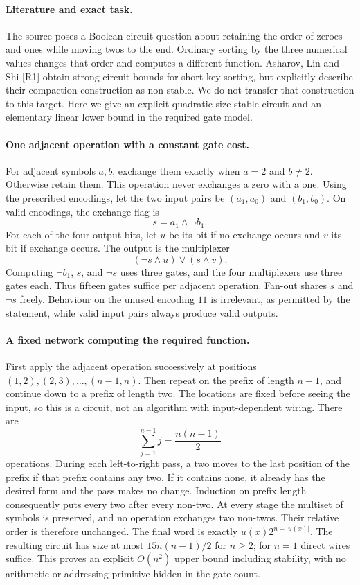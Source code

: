 \documentclass[11pt,a4paper]{article}
\begin{document}
\paragraph{Literature and exact task.}
The source poses a Boolean-circuit question about retaining the order
of zeroes and ones while moving twos to the end. Ordinary sorting
by the three numerical values changes that order and computes a
different function. Asharov, Lin and Shi [R1] obtain strong circuit
bounds for short-key sorting, but explicitly describe their compaction
construction as non-stable. We do not transfer that construction to
this target. Here we give an explicit quadratic-size stable circuit
and an elementary linear lower bound in the required gate model.

\paragraph{One adjacent operation with a constant gate cost.}
For adjacent symbols $a,b$, exchange them exactly when $a=2$ and
$b\ne2$. Otherwise retain them. This operation never exchanges a zero
with a one. Using the prescribed encodings, let the two input pairs be
$(a_1,a_0)$ and $(b_1,b_0)$. On valid encodings, the exchange flag is
\[
                         s=a_1\wedge\neg b_1.
\]
For each of the four output bits, let $u$ be its bit if no exchange
occurs and $v$ its bit if exchange occurs. The output is the multiplexer
\[
                      (\neg s\wedge u)\vee(s\wedge v).
\]
Computing $\neg b_1$, $s$, and $\neg s$ uses three gates, and the four
multiplexers use three gates each. Thus fifteen gates suffice per
adjacent operation. Fan-out shares $s$ and $\neg s$ freely. Behaviour
on the unused encoding $11$ is irrelevant, as permitted by the
statement, while valid input pairs always produce valid outputs.

\paragraph{A fixed network computing the required function.}
First apply the adjacent operation successively at positions
$(1,2),(2,3),\ldots,(n-1,n)$. Then repeat on the prefix of length
$n-1$, and continue down to a prefix of length two. The locations are
fixed before seeing the input, so this is a circuit, not an algorithm
with input-dependent wiring. There are
\[
                       \sum_{j=1}^{n-1}j=\frac{n(n-1)}2
\]
operations. During each left-to-right pass, a two moves to the last
position of the prefix if that prefix contains any two. If it contains
none, it already has the desired form and the pass makes no change.
Induction on prefix length consequently puts every two after every
non-two. At every stage the multiset of symbols is preserved, and no
operation exchanges two non-twos. Their relative order is therefore
unchanged. The final word is exactly $u(x)2^{n-|u(x)|}$.
The resulting circuit has size at most $15n(n-1)/2$ for $n\ge2$;
for $n=1$ direct wires suffice. This proves an explicit $O(n^2)$ upper
bound including stability, with no arithmetic or addressing primitive
hidden in the gate count.
\end{document}
